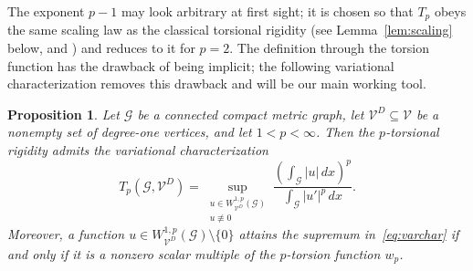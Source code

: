 \documentclass[12pt,a4paper]{article}
\numberwithin{equation}{section}
\newtheorem{proposition}[theorem]{Proposition}
\newcommand{\WpD}{W^{1,p}_{\mathcal{V}^D}(\mathcal G)}
\begin{document}
The exponent $p-1$ may look arbitrary at first sight; it is chosen so
that $T_p$ obeys the same scaling law as the classical torsional
rigidity (see Lemma~\ref{lem:scaling} below, and \cite[Proposition 4.1 (6)]{MuPl}) and reduces to it for
$p=2$. The definition through the torsion function has the drawback of
being implicit; the following variational characterization removes this
drawback and will be our main working tool.

\begin{proposition}
	\label{prop:char}
	Let $\mathcal G$ be a connected compact metric graph,
	let $\mathcal V^D\subseteq\mathcal V$ be a nonempty set of degree-one
	vertices, and let $1<p<\infty$. Then the $p$-torsional rigidity admits
	the variational characterization
	\begin{equation}
		\label{eq:varchar}
		T_p(\mathcal G,\mathcal V^D)
		=
		\sup_{\substack{u\in\WpD\\u\not\equiv0}}
		\frac{\left(\int_{\mathcal G}|u|\,dx\right)^p}
		{\int_{\mathcal G}|u'|^p\,dx}.
	\end{equation}
	Moreover, a function $u\in\WpD\setminus\{0\}$ attains the supremum
	in~\eqref{eq:varchar} if and only if it is a nonzero scalar multiple
	of the $p$-torsion function $w_p$.
\end{proposition}
\end{document}
